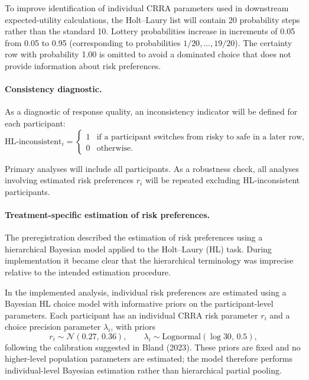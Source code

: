 \documentclass[11pt,a4paper]{article}
\numberwithin{equation}{section}
\begin{document}
To improve identification of individual CRRA parameters used in
downstream expected-utility calculations, the Holt--Laury list
will contain 20 probability steps rather than the standard 10.
Lottery probabilities increase in increments of 0.05 from 0.05
to 0.95 (corresponding to probabilities \(1/20,\dots,19/20\)).
The certainty row with probability 1.00 is omitted to avoid a
dominated choice that does not provide information about risk
preferences.

\paragraph{Consistency diagnostic.}

As a diagnostic of response quality, an inconsistency indicator
will be defined for each participant:
\[
\text{HL-inconsistent}_i =
\begin{cases}
	1 & \text{if a participant switches from risky to safe in a later row}, \\
	0 & \text{otherwise.}
\end{cases}
\]

Primary analyses will include all participants.
As a robustness check, all analyses involving estimated risk preferences
$r_i$ will be repeated excluding HL-inconsistent participants.

\paragraph{Treatment-specific estimation of risk preferences.}

The preregistration described the estimation of risk preferences using a
hierarchical Bayesian model applied to the Holt--Laury (HL) task.
During implementation it became clear that the hierarchical terminology
was imprecise relative to the intended estimation procedure.

In the implemented analysis, individual risk preferences are estimated
using a Bayesian HL choice model with informative priors on the
participant-level parameters. Each participant has an individual CRRA
risk parameter $r_i$ and a choice precision parameter $\lambda_i$,
with priors
\[
r_i \sim \mathcal{N}(0.27,\,0.36),
\qquad
\lambda_i \sim \mathrm{Lognormal}(\log 30,\,0.5),
\]
following the calibration suggested in Bland (2023).
These priors are fixed and no higher-level population parameters are
estimated; the model therefore performs individual-level Bayesian
estimation rather than hierarchical partial pooling.
\end{document}
